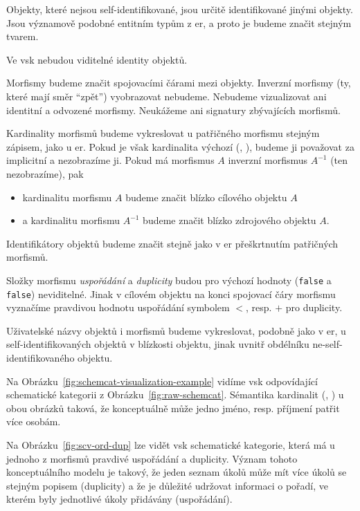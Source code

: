 Objekty, které nejsou self-identifikované, jsou určitě identifikované jinými objekty.
Jsou významově podobné entitním typům z \acrshort{er}, a proto je budeme značit stejným tvarem.

Ve \acrshort{vsk} nebudou viditelné identity objektů.

Morfismy budeme značit spojovacími čárami mezi objekty.
Inverzní morfismy (ty, které mají směr \enquote{zpět}) vyobrazovat nebudeme.
Nebudeme vizualizovat ani identitní a odvozené morfismy.
Neukážeme ani signatury zbývajících morfismů.

Kardinality morfismů budeme vykreslovat u patřičného morfismu stejným zápisem, jako u \acrshort{er}.
Pokud je však kardinalita výchozí (\one, \one), budeme ji považovat za implicitní a nezobrazíme ji.
Pokud má morfismus $A$ inverzní morfismus $A^{-1}$ (ten nezobrazíme), pak
\begin{itemize}
  \item kardinalitu morfismu $A$ budeme značit blízko cílového objektu $A$
  \item a kardinalitu morfismu $A^{-1}$ budeme značit blízko zdrojového objektu $A$.
\end{itemize}

Identifikátory objektů budeme značit stejně jako v \acrshort{er} přeškrtnutím patřičných morfismů.

Složky morfismu \emph{uspořádání} a \emph{duplicity} budou pro výchozí hodnoty (\texttt{false} a \texttt{false}) neviditelné.
Jinak v cílovém objektu na konci spojovací čáry morfismu vyznačíme pravdivou hodnotu uspořádání symbolem $<$, resp. $+$ pro duplicity.

Uživatelské názvy objektů i morfismů budeme vykreslovat, podobně jako v \acrshort{er}, u self-identifikovaných objektů v blízkosti objektu, jinak uvnitř obdélníku ne-self-identifikovaného objektu.

Na Obrázku~\ref{fig:schemcat-visualization-example} vidíme \acrshort{vsk} odpovídající schematické kategorii z Obrázku~\ref{fig:raw-schemcat}.
Sémantika kardinalit (\one, \many) u obou obrázků taková, že konceptuálně může jedno jméno, resp. příjmení patřit více osobám.

Na Obrázku~\ref{fig:scv-ord-dup} lze vidět \acrshort{vsk} schematické kategorie, která má u jednoho z morfismů pravdivé uspořádání a duplicity.
Význam tohoto konceptuálního modelu je takový, že jeden seznam úkolů může mít více úkolů se stejným popisem (duplicity) a že je důležité udržovat informaci o pořadí, ve kterém byly jednotlivé úkoly přidávány (uspořádání).

